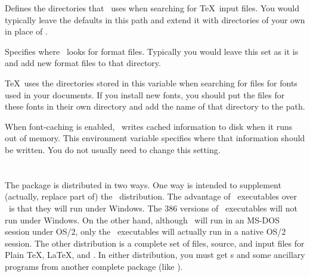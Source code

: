 \begin{iplist}[\textnormal]{.25in}

  Defines the 
  directories that \sbTeX\ uses when searching for \TeX\
  input files.  You would typically leave the defaults in this path
  and extend it with directories of your own in place of .


  Specifies where \sbTeX\ looks for format files.  Typically
  you would leave this set as it is and add new format files to that 
  directory.


  \TeX\ uses the directories stored in this variable when searching for
   files for fonts used in your documents.  If you install new
  fonts, you should put the \ext{TFM} files for these fonts in their
  own directory and add the name of that directory to the 
  path.


  When font-caching is enabled, \sbTeX\ writes cached information to disk when
  it runs out of memory.  This environment variable specifies where that
  information should be written.  You do not usually need to change this
  setting.
\end{iplist}

\section{\protect\gTeX}

The  package is distributed in two ways.  One way is intended to
supplement (actually, replace part of) the \emTeX\ distribution.  The
advantage of \gTeX\ executables over \emTeX\ is that they will run
under Windows.  The 386 versions of \emTeX\ executables will not run
under Windows.  On the other hand, although \gTeX\ will
run in an MS-DOS session under OS/2, only the \emTeX\
executables will actually run in a native OS/2 session.
The other distribution is a complete set of \ext{TFM} files, source, and
input files for Plain \TeX, \LaTeX, and \AMSTeX.
In either distribution, you must get \dvidriver{}s and some ancillary
programs from another complete package (like \emTeX).


